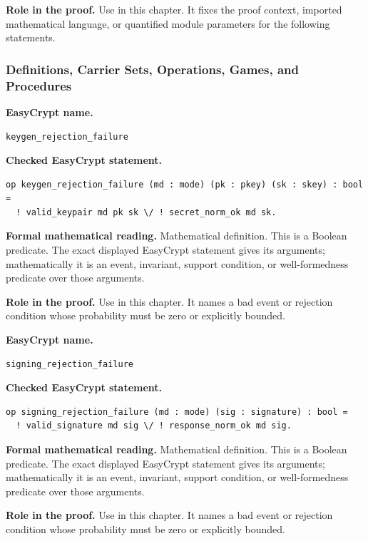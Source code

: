 \noindent\textbf{Role in the proof.}
Use in this chapter. It fixes the proof context, imported mathematical language, or quantified module parameters for the following statements.

\subsubsection*{Definitions, Carrier Sets, Operations, Games, and Procedures}
\begin{formaldefinition}
\noindent\textbf{EasyCrypt name.}
\begin{lstlisting}[language=EasyCrypt,basicstyle=\ttfamily\scriptsize]
keygen_rejection_failure
\end{lstlisting}
\noindent\textbf{Checked EasyCrypt statement.}
\begin{lstlisting}[language=EasyCrypt,basicstyle=\ttfamily\scriptsize]
op keygen_rejection_failure (md : mode) (pk : pkey) (sk : skey) : bool =
  ! valid_keypair md pk sk \/ ! secret_norm_ok md sk.
\end{lstlisting}
\noindent\textbf{Formal mathematical reading.}
Mathematical definition. This is a Boolean predicate.  The exact displayed EasyCrypt statement gives its arguments; mathematically it is an event, invariant, support condition, or well-formedness predicate over those arguments.

\noindent\textbf{Role in the proof.}
Use in this chapter. It names a bad event or rejection condition whose probability must be zero or explicitly bounded.

\end{formaldefinition}

\begin{formaldefinition}
\noindent\textbf{EasyCrypt name.}
\begin{lstlisting}[language=EasyCrypt,basicstyle=\ttfamily\scriptsize]
signing_rejection_failure
\end{lstlisting}
\noindent\textbf{Checked EasyCrypt statement.}
\begin{lstlisting}[language=EasyCrypt,basicstyle=\ttfamily\scriptsize]
op signing_rejection_failure (md : mode) (sig : signature) : bool =
  ! valid_signature md sig \/ ! response_norm_ok md sig.
\end{lstlisting}
\noindent\textbf{Formal mathematical reading.}
Mathematical definition. This is a Boolean predicate.  The exact displayed EasyCrypt statement gives its arguments; mathematically it is an event, invariant, support condition, or well-formedness predicate over those arguments.

\noindent\textbf{Role in the proof.}
Use in this chapter. It names a bad event or rejection condition whose probability must be zero or explicitly bounded.

\end{formaldefinition}

